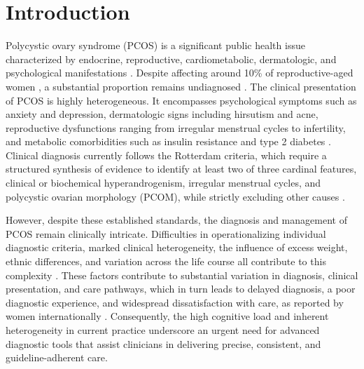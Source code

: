 \documentclass[a4paper,fleqn]{cas-dc}
\begin{document}
\maketitle

\section{Introduction}
Polycystic ovary syndrome (PCOS) is a significant public health issue characterized by endocrine, reproductive, cardiometabolic, dermatologic, and psychological manifestations \cite{azziz2016polycystic}. Despite affecting around 10\% of reproductive-aged women \cite{teede2018recommendations}, a substantial proportion remains undiagnosed \cite{march2010prevalence}. The clinical presentation of PCOS is highly heterogeneous. It encompasses psychological symptoms such as anxiety and depression, dermatologic signs including hirsutism and acne, reproductive dysfunctions ranging from irregular menstrual cycles to infertility, and metabolic comorbidities such as insulin resistance and type 2 diabetes \cite{teede2010polycystic,boomsma2006meta,apridonidze2005prevalence}. Clinical diagnosis currently follows the Rotterdam criteria, which require a structured synthesis of evidence to identify at least two of three cardinal features, clinical or biochemical hyperandrogenism, irregular menstrual cycles, and polycystic ovarian morphology (PCOM), while strictly excluding other causes \cite{eshre2004revised}.

However, despite these established standards, the diagnosis and management of PCOS remain clinically intricate. Difficulties in operationalizing individual diagnostic criteria, marked clinical heterogeneity, the influence of excess weight, ethnic differences, and variation across the life course all contribute to this complexity \cite{saini2016gaps}. These factors contribute to substantial variation in diagnosis, clinical presentation, and care pathways, which in turn leads to delayed diagnosis, a poor diagnostic experience, and widespread dissatisfaction with care, as reported by women internationally \cite{gibson2017delayed}. Consequently, the high cognitive load and inherent heterogeneity in current practice underscore an urgent need for advanced diagnostic tools that assist clinicians in delivering precise, consistent, and guideline-adherent care.
\end{document}
